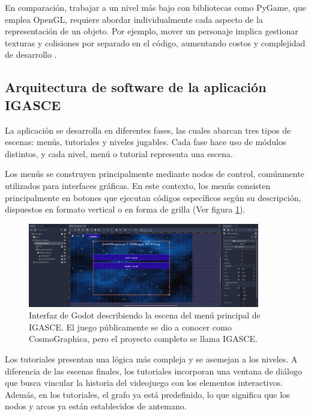 En comparación, trabajar a un nivel más bajo con bibliotecas como PyGame, que emplea OpenGL, requiere abordar individualmente cada aspecto de la representación de un objeto. Por ejemplo, mover un personaje implica gestionar texturas y colisiones por separado en el código, aumentando costos y complejidad de desarrollo \cite{GodotCollisionsAndRendering}.

\subsection{Arquitectura de software de la aplicación IGASCE}

La aplicación se desarrolla en diferentes fases, las cuales abarcan tres tipos de escenas: menús, tutoriales y niveles jugables. Cada fase hace uso de módulos distintos, y cada nivel, menú o tutorial representa una escena.

Los menús se construyen principalmente mediante nodos de control, comúnmente utilizados para interfaces gráficas. En este contexto, los menús consisten principalmente en botones que ejecutan códigos específicos según su descripción, dispuestos en formato vertical o en forma de grilla (Ver figura \ref{GodotMenuInterface}).

\begin{figure}[h]
	\centering
	\includegraphics[width=0.9\textwidth]{imagenes/GodotInterfaceMainMenu.png}
	\caption{Interfaz de Godot describiendo la escena del menú principal de IGASCE. El juego públicamente se dio a conocer como CosmoGraphica, pero el proyecto completo se llama IGASCE.}
	\label{GodotMenuInterface}
\end{figure}


Los tutoriales presentan una lógica más compleja y se asemejan a los niveles. A diferencia de las escenas finales, los tutoriales incorporan una ventana de diálogo que busca vincular la historia del videojuego con los elementos interactivos. Además, en los tutoriales, el grafo ya está predefinido, lo que significa que los nodos y arcos ya están establecidos de antemano.

